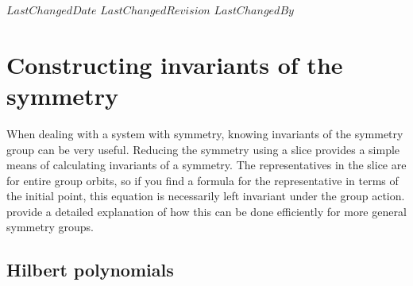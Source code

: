 
{$LastChangedDate$}
{$LastChangedRevision$} {$LastChangedBy$}


\section{Constructing invariants of the symmetry}

When dealing with a system with symmetry, knowing invariants of the
symmetry group can be very useful. Reducing the symmetry
using a slice provides a simple means of calculating invariants of a
symmetry. The representatives in the slice are for entire group orbits,
so if you find a formula for the representative in terms of the initial
point, this equation is necessarily left invariant under the group
action.  provide a detailed explanation
of how this can be done efficiently for more general symmetry groups.


	\ifarticle
	\else

\subsection{Hilbert polynomials}
\label{SF:relStab}

